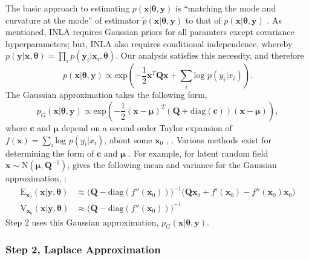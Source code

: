 \documentclass{article}
\begin{document}
The basic approach to estimating $p(\pmb{x}|\pmb{\theta}, \pmb{y})$ is ``matching the mode and curvature at the mode'' of estimator $\tilde{p}(\pmb{x}|\pmb{\theta}, \pmb{y})$ to that of $p(\pmb{x}|\pmb{\theta}, \pmb{y})$ \citep{Rue2005}. As mentioned, INLA requires Gaussian priors for all paramters except covariance hyperparameters; but, INLA also requires conditional independence, whereby $p(\pmb{y}|\pmb{x}, \pmb{\theta}) = \prod_{i} p(\pmb{y}_{i}|\pmb{x}_{i},\pmb{\theta})$. Our analysis satisfies this necessity, and therefore $$p(\pmb{x}|\pmb{\theta},\pmb{y}) \propto \text{exp}\left(-\frac{1}{2}\pmb{x}^{T}\pmb{Q x} + \sum_{i} \text{log }p(y_{i}|x_{i}) \right).$$ The Gaussian approximation takes the following form,
$$p_{G}(\pmb{x}|\pmb{\theta},\pmb{y}) \propto \text{exp} \left( -\frac{1}{2}(\pmb{x-\mu})^{T} (\pmb{Q} + \text{diag}(\pmb{c}) ) (\pmb{x - \mu}) \right),$$
where $\pmb{c}$ and $\pmb{\mu}$ depend on a second order Taylor expansion of $f(\pmb{x}) = \sum_{i} \text{log }p(y_{i}|x_{i})$, about some $\pmb{x}_{0}$ \citep{Rue2007}, \citep{Lindstrom2014}. Various methods exist for determining the form of $\pmb{c}$ and $\pmb{\mu}$ \citep{Rue2009}. For example, for latent random field $\pmb{x} \sim \text{N}(\pmb{\mu}, \pmb{Q}^{-1})$, \cite{Lindstrom2014} gives the following mean and variance for the Gaussian approximation, :
            \begin{align}
           \text{E}_{\pmb{x}_{0}}(\pmb{x}|\pmb{y,\theta}) & \approx \big( \pmb{Q} - \text{diag}(f''(\pmb{x}_{0})) \big)^{-1} \big( \pmb{Q}\pmb{x}_{0} + f'(\pmb{x}_{0}) - f''(\pmb{x}_{0}) \pmb{x}_{0} \big)  \\
           \text{V}_{\pmb{x}_{0}}(\pmb{x}|\pmb{y,\theta}) & \approx \big( \pmb{Q} - \text{diag}(f''(\pmb{x}_{0})) \big)^{-1}
            \end{align}
Step 2 uses this Gaussian approximation, $p_{G}(\pmb{x}|\pmb{\theta},\pmb{y})$.

\subsubsection*{Step 2, Laplace Approximation}  %
\end{document}

